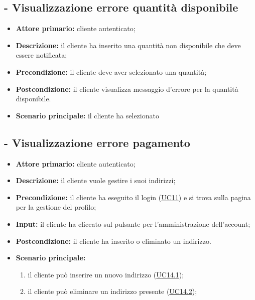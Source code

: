 \stepUserCase
\subsection{ - Visualizzazione errore quantità disponibile}
\begin{itemize}
    \item \textbf{Attore primario:} cliente autenticato;
    \item \textbf{Descrizione:} il cliente ha inserito una quantità non disponibile che deve essere notificata;
    \item \textbf{Precondizione:} il cliente deve aver selezionato una quantità;
    \item \textbf{Postcondizione:} il cliente visualizza messaggio d'errore per la quantità disponibile.
    \item \textbf{Scenario principale:} il cliente ha selezionato 
\end{itemize}

\stepUserCase
\subsection{ - Visualizzazione errore pagamento}
\begin{itemize}
    \item \textbf{Attore primario:} cliente autenticato;
    \item \textbf{Descrizione:} il cliente vuole gestire i suoi indirizzi;
    \item \textbf{Precondizione:} il cliente ha eseguito il login (\hyperref[UC11]{UC11}) e si trova sulla pagina per la gestione del profilo;
    \item \textbf{Input:} il cliente ha cliccato sul pulsante per l'amministrazione dell'account;
    \item \textbf{Postcondizione:} il cliente ha inserito o eliminato un indirizzo.
    \item \textbf{Scenario principale:}
          \begin{enumerate}
              \item il cliente può inserire un nuovo indirizzo (\hyperref[UC14.1]{UC14.1});
              \item il cliente può eliminare un indirizzo presente (\hyperref[UC14.2]{UC14.2});
          \end{enumerate}
\end{itemize}

\stepUserCase
